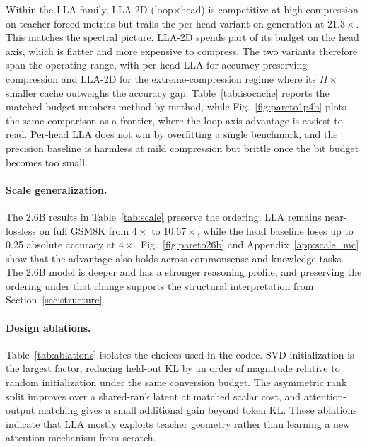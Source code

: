 \documentclass[10pt]{article}
\newcommand{\lla}{LLA}
\begin{document}
Within the \lla{} family, \lla{}-2D (loop$\times$head) is competitive at high compression on teacher-forced metrics but trails the per-head variant on generation at $21.3\times$. This matches the spectral picture. \lla{}-2D spends part of its budget on the head axis, which is flatter and more expensive to compress. The two variants therefore span the operating range, with per-head \lla{} for accuracy-preserving compression and \lla{}-2D for the extreme-compression regime where its $H\times$ smaller cache outweighs the accuracy gap. Table~\ref{tab:isocache} reports the matched-budget numbers method by method, while Fig.~\ref{fig:pareto1p4b} plots the same comparison as a frontier, where the loop-axis advantage is easiest to read. Per-head \lla{} does not win by overfitting a single benchmark, and the precision baseline is harmless at mild compression but brittle once the bit budget becomes too small.

\TableScale
\paragraph{Scale generalization.}
The 2.6B results in Table~\ref{tab:scale} preserve the ordering. \lla{} remains near-lossless on full GSM8K from $4\times$ to $10.67\times$, while the head baseline loses up to 0.25 absolute accuracy at $4\times$. Fig.~\ref{fig:pareto26b} and Appendix~\ref{app:scale_mc} show that the advantage also holds across commonsense and knowledge tasks. The 2.6B model is deeper and has a stronger reasoning profile, and preserving the ordering under that change supports the structural interpretation from Section~\ref{sec:structure}.

\paragraph{Design ablations.}
Table~\ref{tab:ablations} isolates the choices used in the codec. SVD initialization is the largest factor, reducing held-out KL by an order of magnitude relative to random initialization under the same conversion budget. The asymmetric rank split improves over a shared-rank latent at matched scalar cost, and attention-output matching gives a small additional gain beyond token KL. These ablations indicate that \lla{} mostly exploits teacher geometry rather than learning a new attention mechanism from scratch.
\end{document}
